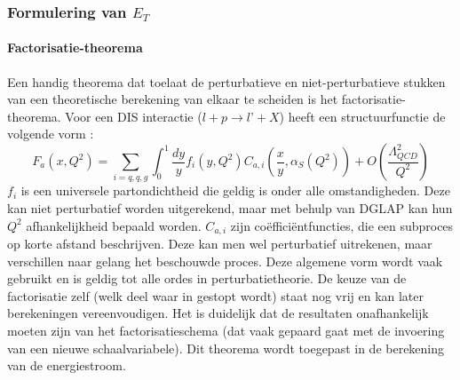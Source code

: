 \documentclass[a4paper,11pt]{article}
\numberwithin{equation}{section} %
\begin{document}
    \subsubsection{Formulering van $E_T$}
      \paragraph{Factorisatie-theorema} \label{sec:FactorisatieTheorema}
Een handig theorema dat toelaat de perturbatieve en niet-perturbatieve stukken van een  theoretische berekening van elkaar te scheiden is het factorisatie-theorema.
Voor een DIS interactie ($l+p\rightarrow l’+X$) heeft een structuurfunctie de volgende vorm \cite{Martin}: 
\begin{equation}
F_a(x, Q^2) = \sum_{i=q,q,g} \int_0^1 \frac{dy}{y} f_i(y, Q^2) C_{a,i} \left( \frac{x}{y},\alpha_S(Q^2) \right) + O \left( \frac{\Lambda_{QCD}^2}{Q^2} \right) 
\end{equation}
$f_i$ is een universele partondichtheid die geldig is onder alle omstandigheden.
Deze kan niet perturbatief worden uitgerekend, maar met behulp van DGLAP kan hun $Q^2$ afhankelijkheid bepaald worden.
$C_{a,i}$ zijn coëfficiëntfuncties, die een subproces op korte afstand beschrijven.
Deze kan men wel perturbatief uitrekenen, maar verschillen naar gelang het beschouwde proces.
Deze algemene vorm wordt vaak gebruikt en is geldig tot alle ordes in perturbatietheorie.
De keuze van de factorisatie zelf (welk deel waar in gestopt wordt) staat nog vrij en kan later berekeningen vereenvoudigen.
Het is duidelijk dat de resultaten onafhankelijk moeten zijn van het factorisatieschema (dat vaak gepaard gaat met de invoering van een nieuwe schaalvariabele).
Dit theorema wordt toegepast in de berekening van de energiestroom.
\end{document}
